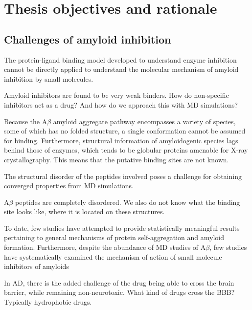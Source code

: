 \section{Thesis objectives and rationale}
\subsection{Challenges of amyloid inhibition}
\begin{outline}

    \1 The protein-ligand binding model developed to understand enzyme inhibition cannot be directly applied to understand the molecular mechanism of amyloid inhibition by small molecules. 
    
      \2 Amyloid inhibitors are found to be very weak binders. How do non-specific inhibitors act as a drug? And how do we approach this with MD simulations?
      
      \2  Because the A$\beta$ amyloid aggregate pathway encompasses a variety of species, some of which has no folded structure, a single conformation cannot be assumed for binding. Furthermore, structural information of amyloidogenic species lags behind those of enzymes, which tends to be globular proteins amenable for X-ray crystallography. This means that the putative binding sites are not known.
      
      \2 The structural disorder of the peptides involved poses a challenge for obtaining converged properties from MD simulations. 
    
    	\1 A$\beta$ peptides are completely disordered.  We also do not know what the binding site looks like, where it is located on these structures.
    	
    \1 To date, few studies have attempted to provide statistically meaningful results pertaining to general mechanisms of protein self-aggregation and amyloid formation. Furthermore, despite the abundance of MD studies of A$\beta$, few studies have systematically examined the mechanism of action of small molecule inhibitors of amyloids

    \1 In AD, there is the added challenge of the drug being able to cross the brain barrier, while remaining non-neurotoxic.  What kind of drugs cross the BBB?  Typically hydrophobic drugs.
\end{outline}    

